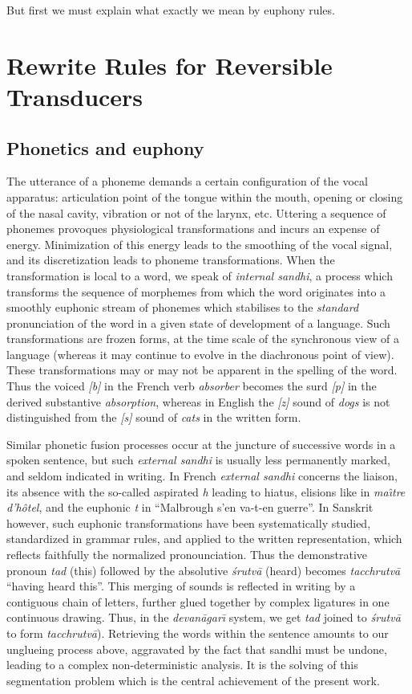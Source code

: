 But first we must explain what exactly we mean by euphony rules.

\section{Rewrite Rules for Reversible Transducers}

\subsection{Phonetics and euphony}

The utterance of a phoneme demands a certain configuration of the vocal 
apparatus: articulation point of the tongue within the mouth, opening or
closing of the nasal cavity, vibration or not of the larynx, etc.
Uttering a sequence of phonemes provoques physiological transformations and
incurs an expense of energy. Minimization of this energy leads to the 
smoothing of the vocal signal, and its discretization leads to phoneme
transformations.
When the transformation is local to a word, we speak of
{\sl internal sandhi}, a process which transforms the sequence of morphemes
from which the word originates into a smoothly %
euphonic stream of phonemes which
stabilises to the {\sl standard} pronunciation of the word in a given state
of development of a language. Such transformations are frozen forms, at the
time scale of the synchronous view of a language (whereas it may continue to
evolve in the diachronous point of view). These transformations may or may not
be apparent in the spelling of the word. Thus the voiced {\sl [b]} 
in the French 
verb {\sl absorber} becomes the surd {\sl [p]} in the derived substantive
{\sl absorption}, whereas in English the {\sl [z]} sound of {\sl dogs} is not
distinguished from the {\sl [s]} sound of {\sl cats} in the written form. 

Similar phonetic fusion processes occur at the juncture of successive 
words in a spoken sentence, but such {\sl external sandhi} is usually less
permanently marked, and seldom indicated in writing. In French {\sl external 
sandhi} concerns the liaison, its absence with the so-called aspirated {\sl h} 
leading to hiatus, elisions like in {\sl ma{\^\i}tre d'h{\^o}tel}, 
and the euphonic {\sl t} in ``Malbrough s'en va-t-en guerre''.
In Sanskrit however, such euphonic transformations have been systematically
studied, standardized in grammar rules, and applied to the written 
representation, which reflects faithfully the normalized pronounciation.
Thus the demonstrative pronoun {\sl tad} (this) followed by the
absolutive {\sl \'srutv\=a} (heard) becomes {\sl tacchrutv\=a} 
``having heard this''. This merging of sounds is reflected in writing
by a contiguous chain of letters, further glued together by complex ligatures
in one continuous drawing. Thus, in the {\sl devan\=agar{\=\i}} system,
we get {\sl tad} joined to 
{\sl \'srutv\=a} to form {\sl tacchrutv\=a}). 
Retrieving the words within the sentence amounts to our unglueing process
above, aggravated by the fact that sandhi must be undone, leading to a 
complex non-deterministic analysis. It is the solving of this segmentation
problem which is the central achievement of the present work.

